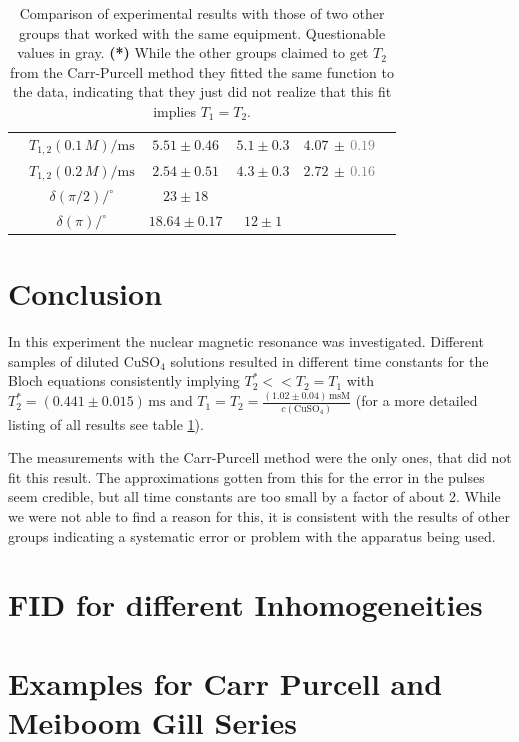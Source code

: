 \documentclass[a4paper]{scrartcl}
\numberwithin{equation}{section}
\numberwithin{figure}{section}
\numberwithin{table}{section}
\begin{document}
\begin{table}[!tbh]
\begin{tabular}{cccccc}
& $T_{1,2}(0.1\,M) / \text{ms}$ & $5.51\pm 0.46$ & $5.1\pm 0.3$ & $4.07\,\pm\,$\textcolor{Gray}{$0.19$} \\
& $T_{1,2}(0.2\,M) / \text{ms}$ & $2.54\pm 0.51$ & $4.3\pm 0.3$ & $2.72\,\pm\,$\textcolor{Gray}{$0.16$} \\
& $\delta(\pi/2) / ^\circ$ & $23 \pm 18$ & & \\
& $\delta(\pi) / ^\circ$ & $18.64\pm 0.17$ & $12\pm 1$ & \\
\midrule
\bottomrule
\end{tabular}
\caption{\small Comparison of experimental results with those of two other groups that worked with the same equipment. Questionable values in gray. \textbf{(*)} While the other groups claimed to get $T_2$ from the Carr-Purcell method they fitted the same function to the data, indicating that they just did not realize that this fit implies $T_1=T_2$. }
\label{tab:compare}
\end{table}


\section{Conclusion}
In this experiment the nuclear magnetic resonance was investigated. Different samples of diluted CuSO$_4$ solutions resulted in different time constants for the Bloch equations consistently implying $T_2^* << T_2 = T_1$ with $T_2^*=(0.441\pm 0.015)\,\text{ms}$ and $T_1=T_2= \frac{(1.02\pm 0.04)\,\text{msM}}{c(\text{CuSO}_4)}$ (for a more detailed listing of all results see table \ref{tab:compare}).

The measurements with the Carr-Purcell method were the only ones, that did not fit this result. The approximations gotten from this for the error in the pulses seem credible, but all time constants are too small by a factor of about 2. While we were not able to find a reason for this, it is consistent with the results of other groups indicating a systematic error or problem with the apparatus being used.


\FloatBarrier
\clearpage
 



\clearpage
\appendix
\section{FID for different Inhomogeneities}
\section{Examples for Carr Purcell and Meiboom Gill Series}
\end{document}
